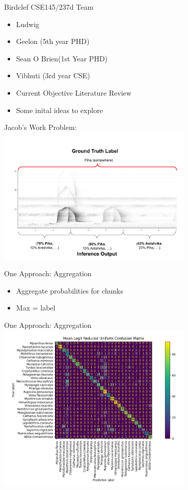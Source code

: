 \begin{frame}{Birdclef CSE145/237d Team}
    \begin{itemize}
        \item Ludwig
        \item Geelon (5th year PHD)
        \item Sean O Brien(1st Year PHD)
        \item Vibhuti (3rd year CSE)
        \item Current Objective Literature Review
        \item Some inital ideas to explore 
    \end{itemize}
\end{frame}

\begin{frame}{Jacob's Work}
    \centering
    Problem:\\
    \includegraphics[height=0.9\textheight,width=0.7\textwidth,keepaspectratio]{images/spectrogram-.png}
\end{frame}

\begin{frame}{One Approach: Aggregation}
    \begin{itemize}
        \item Aggregate probabilities for chunks
        \item Max = label
    \end{itemize}
\end{frame}

\begin{frame}{One Approach: Aggregation}
    \centering
    \includegraphics[height=0.8\textheight,width=0.7\textwidth,keepaspectratio]{images/logit_confusion_matrix.png}
\end{frame}


